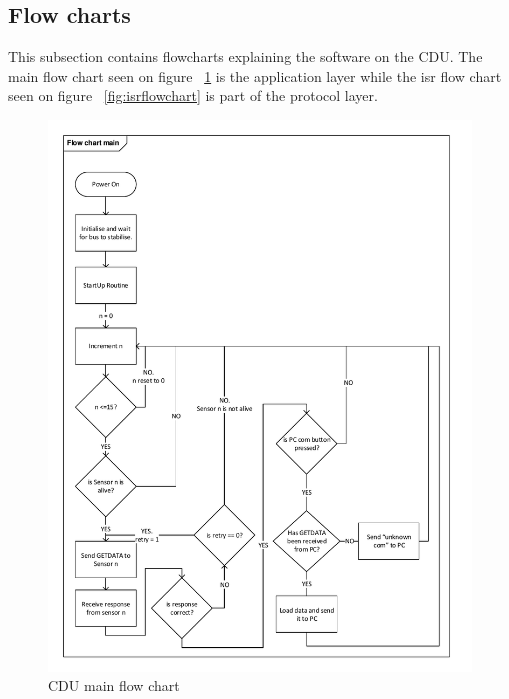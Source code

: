 \subsection{Flow charts}
This subsection contains flowcharts explaining the software on the CDU. The main flow chart seen on figure ~\ref{fig:mainflowchart} is the application layer while the isr flow chart seen on figure ~\ref{fig:isrflowchart} is part of the protocol layer. 
\begin{figure}[H]
\centering
\includegraphics[width=1\textwidth]{billeder/mainflowchart}
\caption{CDU main flow chart}
\label{fig:mainflowchart}
\end{figure}

